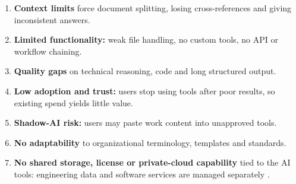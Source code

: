 \begin{enumerate}
  \item \textbf{Context limits} force document splitting, losing cross-references and
    giving inconsistent answers.
  \item \textbf{Limited functionality:} weak file handling, no custom tools, no API or
    workflow chaining.
  \item \textbf{Quality gaps} on technical reasoning, code and long structured output.
  \item \textbf{Low adoption and trust:} users stop using tools after poor results, so
    existing spend yields little value.
  \item \textbf{Shadow-AI risk:} users may paste work content into unapproved tools.
  \item \textbf{No adaptability} to organizational terminology, templates and standards.
  \item \textbf{No shared storage, license or private-cloud capability} tied to the
    AI tools: engineering data and software services are managed separately
    .
\end{enumerate}
